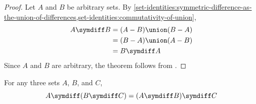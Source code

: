 \begin{proof}
    Let \( A \) and \( B \) be arbitrary sets. By \cref{set-identities:symmetric-difference-as-the-union-of-differences,set-identities:commutativity-of-union},
    \begin{align*}
        A \symdiff B
        &=
        \mleft( A - B \mright) \union \mleft( B - A \mright)\\
        &=
        \mleft( B - A \mright) \union \mleft( A - B \mright)\\
        &=
        B \symdiff A
    \end{align*}
    Since \( A \) and \( B \) are arbitrary, the theorem follows from .
\end{proof}

\begin{thm}[Associativity]
    \label{set-identities:associativity-of-symmetric-difference}
    For any three sets \( A \), \( B \), and \( C \),
    \begin{equation*}
        A \symdiff \mleft( B \symdiff C \mright) =
        \mleft( A \symdiff B \mright) \symdiff C
    \end{equation*}
\end{thm}

